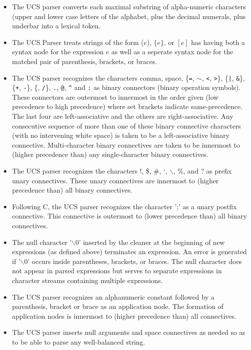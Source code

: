 \documentclass{article}
\newcommand{\mtt}[1]{\mbox{\tt #1}}
\begin{document}
\begin{itemize}
\item The UCS parser converts each maximal substring of alpha-numeric characters (upper and lower case letters of the alphabet, plus the decimal numerals, plus underbar into a lexical token.

\item The UCS Parser treats strings of the form ($e$), $\{e\}$, or $[e]$ has having both a syntax node for the expression $e$ as well as a seperate syntax node
for the matched pair of parenthesis, brackets, or braces.

\item The UCS parser recognizes the characters comma, space,
  \{\mtt{=}, \mtt{$\sim$}, \mtt{<}, \mtt{>}\}, \{\mtt{|}, \mtt{\&}\}, \{\mtt{+}, \mtt{-}\}, \{\mtt{*}, \mtt{/}\}, \mtt{.}, \mtt{@}, \mtt{\^{}} and \mtt{:} as
binary connectors (binary operation symbols).
These connectors are outermost to innermost in the order given (low precedence to high precedence) where set brackets indicate same-precedence.
The last four are left-associative and the others are right-associative.
Any consecutive sequence of more than one of these binary connective characters (with no intervening white space) is taken to be a left-associative binary connective.
Multi-character binary connectives
are taken to be innermost to (higher precedence than) any single-character binary connectives.

\item The UCS parser recognizes the characters !, \$, \#, `, $\backslash$, \%, and ? as prefix unary connectives.  These unary connectives are innermost to (higher precedence than)
all binary connectives.

\item Following C, the UCS parser recognizes the character ';' as a unary postfix connective.  This connective is outermost to (lower precedence than) all binary connectives.

\item The null character '$\backslash$0' inserted by the cleaner at the beginning of new expressions (as defined above) terminates an expression.
  An error is generated if '$\backslash$0' occurs inside parentheses, brackets, or braces.  The null character does not appear in parsed expressions but serves to separate
  expressions in character streams containing multiple expressions.

\item The UCS parser recognizes an alphanumeric constant followed by a parenthesis, bracket or brace as an application node.  The formation of application
nodes is innermost to (higher precedence than) all connectives.

\item The UCS parser inserts null arguments and space connectives as needed so as to be able to parse any well-balanced string.
\end{itemize}
\end{document}
